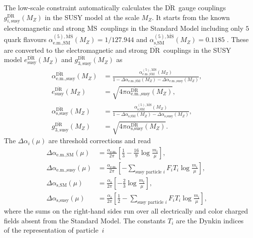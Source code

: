 \documentclass[final,3p,11pt,pdflatex]{elsarticle}
\newcommand{\textoverline}[1]{$\overline{\mbox{#1}}$}
\newcommand{\DRbar}{\textoverline{DR}\xspace}
\newcommand{\MSbar}{\textoverline{MS}\xspace}
\begin{document}
The low-scale constraint automatically calculates the \DRbar\ gauge
couplings $g_{i,\text{susy}}^{\text{\DRbar}}(M_Z)$ in the SUSY model
at the scale $M_Z$.  It starts from the known electromagnetic and
strong \MSbar\ couplings in the Standard Model including only $5$
quark flavours
$\alpha_{\text{e.m.},\text{SM}}^{(5),\text{\MSbar}}(M_Z) = 1/127.944$
and $\alpha_{\text{s},\text{SM}}^{(5),\text{\MSbar}}(M_Z) = 0.1185$
\cite{Beringer:1900zz}.  These are converted to the electromagnetic
and strong \DRbar\ couplings in the SUSY model
$e_{\text{susy}}^{\text{\DRbar}}(M_Z)$ and
$g_{3,\text{susy}}^{\text{\DRbar}}(M_Z)$ as
%
\begin{align}
  \alpha_{\text{e.m.},\text{susy}}^{\text{\DRbar}}(M_Z) &=
  \frac{\alpha_{\text{e.m.},\text{SM}}^{(5),\text{\MSbar}}(M_Z)}{1 -
    \Delta\alpha_{\text{e.m.},\text{SM}}(M_Z) -
    \Delta\alpha_{\text{e.m.},\text{susy}}(M_Z)} ,\\
    e_{\text{susy}}^{\text{\DRbar}}(M_Z) &=
    \sqrt{4\pi\alpha_{\text{e.m.},\text{susy}}^{\text{\DRbar}}(M_Z)}, \\
  \alpha_{\text{s},\text{susy}}^{\text{\DRbar}}(M_Z) &=
  \frac{\alpha_{\text{s},\text{SM}}^{(5),\text{\MSbar}}(M_Z)}{1 -
    \Delta\alpha_{\text{s},\text{SM}}(M_Z)
    - \Delta\alpha_{\text{s},\text{susy}}(M_Z)} ,\\
  g_{3,\text{susy}}^{\text{\DRbar}}(M_Z) &=
  \sqrt{4\pi\alpha_{\text{s},\text{susy}}^{\text{\DRbar}}(M_Z)} .
\end{align}
%
The $\Delta\alpha_i(\mu)$ are threshold corrections and read
%
\begin{align}
  \Delta\alpha_{\text{e.m.},\text{SM}}(\mu) &=
  \frac{\alpha_\text{e.m.}}{2\pi} \left[\frac{1}{3}
    - \frac{16}{9} \log{\frac{m_t}{\mu}} \right],\\
  \Delta\alpha_{\text{e.m.},\text{susy}}(\mu) &=
  \frac{\alpha_\text{e.m.}}{2\pi} \left[ -\sum_{\text{susy particle }
      i}
    F_i T_i \log{\frac{m_i}{\mu}} \right],\\
  \Delta\alpha_{\text{s},\text{SM}}(\mu) &=
  \frac{\alpha_\text{s}}{2\pi} \left[
    -\frac{2}{3} \log{\frac{m_t}{\mu}} \right],\\
  \Delta\alpha_{\text{s},\text{susy}}(\mu) &=
  \frac{\alpha_\text{s}}{2\pi}\left[ \frac{1}{2}-\sum_{\text{susy
        particle } i} F_i T_i \log{\frac{m_i}{\mu}} \right] ,
\end{align}
%
where the sums on the right-hand sides run over all electrically and
color charged fields absent from the Standard Model.  The constants
$T_i$ are the Dynkin indices of the representation of particle~$i$
\end{document}

